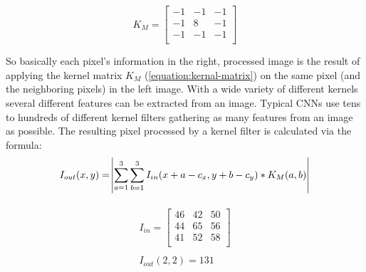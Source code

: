 \documentclass[12pt,twoside]{article}
\theoremstyle{plain}
\theoremstyle{definition}
\theoremstyle{remark}
\begin{document}
\begin{figure}
	\begin{equation}
		\label{equation:kernal-matrix}
		K_M =
		\begin{bmatrix}
		-1 & -1 & -1 \\
		-1 & 8 & -1 \\
		-1 & -1 & -1 \\
		\end{bmatrix}
	\end{equation}
\end{figure}
So basically each pixel's information in the right, processed image is the result of applying the kernel matrix $K_M$ (\ref{equation:kernal-matrix}) on the same pixel (and the neighboring pixels) in the left image. With a wide variety of different kernels several different features can be extracted from an image. Typical CNNs use tens to hundreds of different kernel filters gathering as many features from an image as possible. The resulting pixel processed by a kernel filter is calculated via the formula:
\begin{equation}
I_{out}(x,y) =
\abs{\sum_{a=1}^{3} \sum_{b=1}^{3} I_{in} (x+a-c_x, y+b-c_y) * K_M(a,b)}
\end{equation}

\begin{figure}
	\begin{small}
		\vspace{-20pt}
		\begin{gather}
			\label{equation:example-kernel-processing}
			\begin{split}
				I_{in} =
				\begin{bmatrix}
				46 & 42 & 50 \\
				44 & 65 & 56 \\
				41 & 52 & 58 \\
				\end{bmatrix}
				\\
				\\
				I_{out}(2,2) = 131
			\end{split}
		\end{gather}
	\end{small}
\end{figure}
\end{document}
